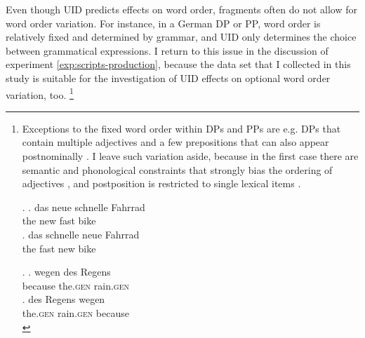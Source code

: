 Even though UID predicts effects on word order, fragments often do not allow for word order variation. For instance, in a German DP or PP, word order is relatively fixed and determined by grammar, and UID only determines the choice between grammatical expressions. I return to this issue in the discussion of experiment \ref{exp:scripts-production}, because the data set that I collected in this study is suitable for the investigation of UID effects on optional word order variation, too.%
%
\footnote{Exceptions to the fixed word order within DPs and PPs are e.g. DPs that contain multiple adjectives \Next and a few prepositions that can also appear postnominally \NNext. I leave such variation aside, because in the first case there are semantic and phonological constraints that strongly bias the ordering of adjectives \citep{martin1969, dixon1977, cinque1994, wulff2003}, and postposition \NNext is restricted to single lexical items \citep{dimeola2003}.

\ex. \ag. das neue schnelle Fahrrad\\
	  the new fast bike\\
     \bg. das schnelle neue Fahrrad\\
	  the fast new bike\\

\ex. \ag. wegen des Regens\\
	  because the.\textsc{gen} rain.\textsc{gen}\\
      \bg. des Regens wegen\\
	  the.\textsc{gen} rain.\textsc{gen} because\\

}\afterfn%
%

